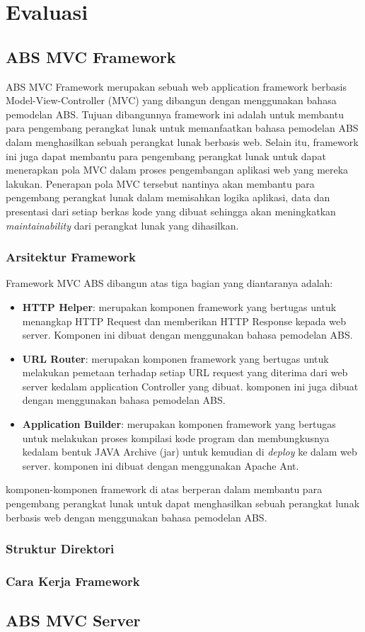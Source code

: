 \chapter{Evaluasi}

\section{ABS MVC Framework}
ABS MVC Framework merupakan sebuah web application framework berbasis Model-View-Controller (MVC) yang dibangun dengan menggunakan bahasa pemodelan ABS. Tujuan dibangunnya framework ini adalah untuk membantu para pengembang perangkat lunak untuk memanfaatkan bahasa pemodelan ABS dalam menghasilkan sebuah perangkat lunak berbasis web. Selain itu, framework ini juga dapat membantu para pengembang perangkat lunak untuk dapat menerapkan pola MVC dalam proses pengembangan aplikasi web yang mereka lakukan. Penerapan pola MVC tersebut nantinya akan membantu para pengembang perangkat lunak dalam memisahkan logika aplikasi, data dan presentasi dari setiap berkas kode yang dibuat sehingga akan meningkatkan \textit{maintainability} dari perangkat lunak yang dihasilkan.

\subsection{Arsitektur Framework}
Framework MVC ABS dibangun atas tiga bagian yang diantaranya adalah:
\begin{itemize}
    \item \textbf{HTTP Helper}: merupakan komponen framework yang bertugas untuk menangkap HTTP Request dan memberikan HTTP Response kepada web server. Komponen ini dibuat dengan menggunakan bahasa pemodelan ABS.
    \item \textbf{URL Router}: merupakan komponen framework yang bertugas untuk melakukan pemetaan terhadap setiap URL request yang diterima dari web server kedalam application Controller yang dibuat. komponen ini juga dibuat dengan menggunakan bahasa pemodelan ABS.
    \item \textbf{Application Builder}: merupakan komponen framework yang bertugas untuk melakukan proses kompilasi kode program dan membungkusnya kedalam bentuk JAVA Archive (jar) untuk kemudian di \textit{deploy} ke dalam web server. komponen ini dibuat dengan menggunakan Apache Ant.
\end{itemize}

\noindent
komponen-komponen framework di atas berperan dalam membantu para pengembang perangkat lunak untuk dapat menghasilkan sebuah perangkat lunak berbasis web dengan menggunakan bahasa pemodelan ABS.

\subsection{Struktur Direktori}

\subsection{Cara Kerja Framework}


\section{ABS MVC Server}
